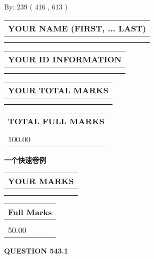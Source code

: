 \documentclass{ctexart}
\begin{document}
   
\hspace{1.0in} By: 
 239 ( 416 ,  613 )
   
   
   
   
\newpage 
\setcounter{page}{ 
   543001 } 
   
   
   
   
\noindent\begin{tabular}{|l|}
\hline
YOUR NAME (FIRST, ... LAST)  \\
\hline
 \\ 
 \\ 
\hline
\end{tabular}
\hspace{0.05in} \begin{tabular}{|l|}
\hline
 YOUR   ID   INFORMATION  \\
\hline
 \\ 
 \\ 
\hline
\end{tabular}
   
   
\vspace{0.2in}\noindent\begin{tabular}{|l|}
\hline
YOUR TOTAL MARKS  \\
\hline
 \\ 
 \\ 
\hline
\end{tabular}
\hspace{0.05in} \begin{tabular}{|l|}
\hline
TOTAL FULL MARKS  \\
\hline
 \\ 
100.00 \\
\hline
\end{tabular}
   
   
 \vspace{0.2in}
{\LARGE {\textbf{ 一个快速卷例}}}
   
   
  
\vspace{0.2in}
  
\noindent\begin{tabular}{|l|}
\hline
 YOUR MARKS  \\
\hline
 \\ 
 \\ 
\hline
\end{tabular}
\hspace{0.05in} \begin{tabular}{|l|}
\hline
 Full Marks  \\
\hline
 \\ 
50.00 \\
\hline
\end{tabular}
{\textbf{\Large{QUESTION
543.1 
}}}
  
\end{document}
